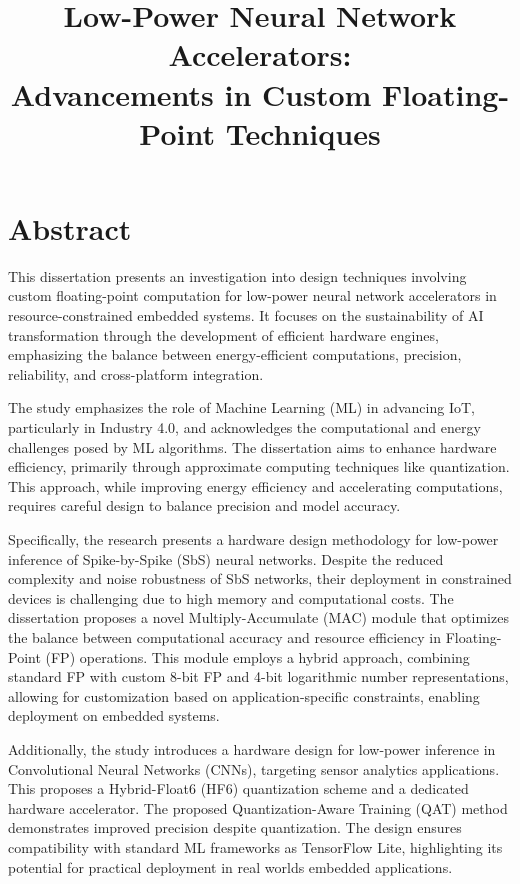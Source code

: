 \documentclass{article}
\title{Low-Power Neural Network Accelerators: \\Advancements in Custom Floating-Point Techniques}
\author{}
\date{}
\begin{document}
	
	\maketitle
	
	\section*{Abstract}
	This dissertation presents an investigation into design techniques involving custom floating-point computation for low-power neural network accelerators in resource-constrained embedded systems. It focuses on the sustainability of AI transformation through the development of efficient hardware engines, emphasizing the balance between energy-efficient computations, precision, reliability, and cross-platform integration.
	
	The study emphasizes the role of Machine Learning (ML) in advancing IoT, particularly in Industry 4.0, and acknowledges the computational and energy challenges posed by ML algorithms. The dissertation aims to enhance hardware efficiency, primarily through approximate computing techniques like quantization. This approach, while improving energy efficiency and accelerating computations, requires careful design to balance precision and model accuracy.
	
	Specifically, the research presents a hardware design methodology for low-power inference of Spike-by-Spike (SbS) neural networks. Despite the reduced complexity and noise robustness of SbS networks, their deployment in constrained devices is challenging due to high memory and computational costs. The dissertation proposes a novel Multiply-Accumulate (MAC) module that optimizes the balance between computational accuracy and resource efficiency in Floating-Point (FP) operations. This module employs a hybrid approach, combining standard FP with custom 8-bit FP and 4-bit logarithmic number representations, allowing for customization based on application-specific constraints, enabling deployment on embedded systems.
	
	Additionally, the study introduces a hardware design for low-power inference in Convolutional Neural Networks (CNNs), targeting sensor analytics applications. This proposes a Hybrid-Float6 (HF6) quantization scheme and a dedicated hardware accelerator. The proposed Quantization-Aware Training (QAT) method demonstrates improved precision despite quantization. The design ensures compatibility with standard ML frameworks as TensorFlow Lite, highlighting its potential for practical deployment in real worlds embedded applications.
	
\end{document}
